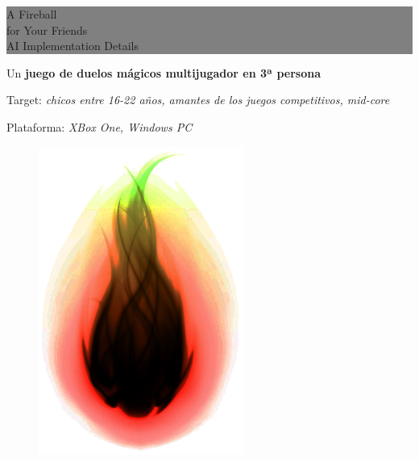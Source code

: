 \documentclass[12pt]{article}
\begin{document}
\pagestyle{empty} %


\colorbox{grey}{
	\parbox[t]{1.0\linewidth}{
		\fontsize{50pt}{30pt}\selectfont %
		\vspace*{0.7cm} %
		
		A Fireball \\ 
		for Your Friends \\ 
        \fontsize{30pt}{34pt}\selectfont
        AI Implementation Details		
		\par
		
		\vspace*{0.4cm} %
	}
}

\vspace*{0.4cm} 
{\large Un \textbf{juego de duelos mágicos multijugador en 3ª persona}}

\begin{spacing}{0.6}
Target: \textit{chicos entre 16-22 años, amantes de los juegos competitivos, mid-core} 

Plataforma: \textit{XBox One, Windows PC}
\end{spacing}


\begin{figure}[h]
    \centering
    \includegraphics[width=0.6\textwidth]{fireball}
\end{figure}
\end{document}
